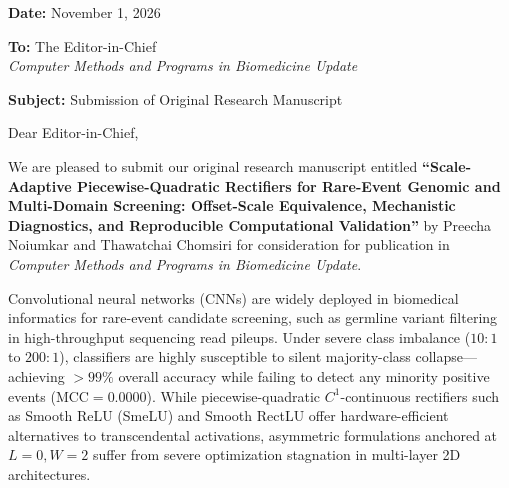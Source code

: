 \documentclass[11pt,a4paper]{article}
\begin{document}
\textbf{Date:} November 1, 2026

\vspace{0.5em}
\textbf{To:} The Editor-in-Chief\\
\textit{Computer Methods and Programs in Biomedicine Update}

\vspace{0.5em}
\textbf{Subject:} Submission of Original Research Manuscript

\vspace{0.5em}
Dear Editor-in-Chief,

We are pleased to submit our original research manuscript entitled \textbf{``Scale-Adaptive Piecewise-Quadratic Rectifiers for Rare-Event Genomic and Multi-Domain Screening: Offset-Scale Equivalence, Mechanistic Diagnostics, and Reproducible Computational Validation''} by Preecha Noiumkar and Thawatchai Chomsiri for consideration for publication in \textit{Computer Methods and Programs in Biomedicine Update}.

Convolutional neural networks (CNNs) are widely deployed in biomedical informatics for rare-event candidate screening, such as germline variant filtering in high-throughput sequencing read pileups. Under severe class imbalance ($10:1$ to $200:1$), classifiers are highly susceptible to silent majority-class collapse---achieving $>99\%$ overall accuracy while failing to detect any minority positive events ($\text{MCC} = 0.0000$). While piecewise-quadratic $C^1$-continuous rectifiers such as Smooth ReLU (SmeLU) and Smooth RectLU offer hardware-efficient alternatives to transcendental activations, asymmetric formulations anchored at $L = 0, W = 2$ suffer from severe optimization stagnation in multi-layer 2D architectures.
\end{document}
